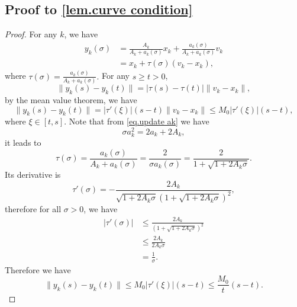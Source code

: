 \documentclass{article}
\begin{document}
\subsection*{Proof to \autoref{lem.curve condition}}
\begin{proof}
    For any $k$, we have
    \begin{equation*}
    \begin{aligned}
        y_k(\sigma) &= \frac{A_k}{A_k+a_k(\sigma)}x_k+\frac{a_k(\sigma)}{A_k+a_k(\sigma)}v_k\\
        &= x_k + \tau (\sigma) (v_k-x_k),
    \end{aligned}
    \end{equation*}
    where $\tau(\sigma) = \frac{a_k(\sigma)}{A_k+a_k(\sigma)}.$ For any $s\geq t>0$,
    \begin{equation*}
        \|y_k(s)-y_k(t)\| = \left|\tau(s)-\tau(t)\right| \|v_k-x_k\|,
    \end{equation*}
    by the mean value theorem, we have
    \begin{equation*}
        \|y_k(s)-y_k(t)\| = \left|\tau'(\xi)\right|(s-t) \|v_k-x_k\|\leq M_0\left|\tau'(\xi)\right|(s-t),
    \end{equation*}
    where $\xi \in \left[t,s\right]$. Note that from \eqref{eq.update ak} we have
    \begin{equation*}
        \sigma a_k^2=2a_k+2A_k,
    \end{equation*}
    it leads to 
    \begin{equation*}
        \tau(\sigma) = \frac{a_k(\sigma)}{A_k+a_k(\sigma)} = \frac{2}{\sigma a_k(\sigma)} = \frac{2}{1+\sqrt{1+2A_k\sigma}}.
    \end{equation*}
    Its derivative is
    \begin{equation*}
        \tau'(\sigma) = -\frac{2A_k}{\sqrt{1+2A_k\sigma}\left(1+\sqrt{1+2A_k\sigma}\right)^2},
    \end{equation*}
    therefore for all $\sigma>0$, we have
    \begin{equation*}
    \begin{aligned}
        \left|\tau'(\sigma)\right| &\leq \frac{2A_k}{\left(1+\sqrt{1+2A_k\sigma}\right)^2}\\
        &\leq \frac{2A_k}{2A_k\sigma}\\
        &= \frac{1}{\sigma}.
    \end{aligned}
    \end{equation*}
    Therefore we have
    \begin{equation*}
        \|y_k(s)-y_k(t)\|\leq M_0\left|\tau'(\xi)\right|(s-t)\leq \frac{M_0}{t}(s-t).
    \end{equation*}
\end{proof}
\end{document}
